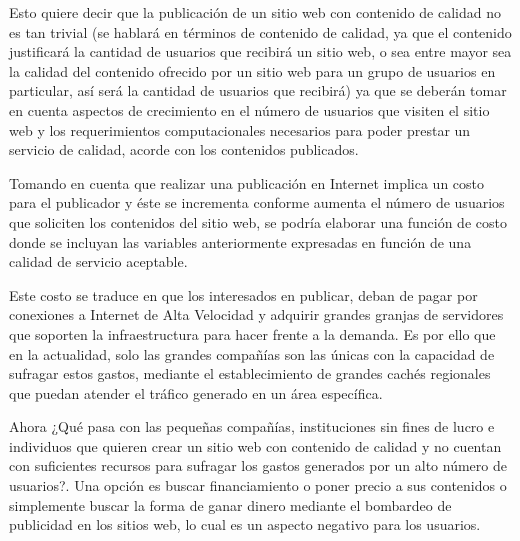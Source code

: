 Esto quiere decir que la publicación de un sitio web con contenido de calidad no es tan trivial (se hablará en términos de contenido de calidad, ya que el contenido justificará la cantidad de usuarios que recibirá un sitio web, o sea entre mayor sea la calidad del contenido ofrecido por un sitio web para un grupo de usuarios en particular, así será la cantidad de usuarios que recibirá) ya que se deberán tomar en cuenta aspectos de crecimiento en el número de usuarios que visiten el sitio web y los requerimientos computacionales necesarios para poder prestar un servicio de calidad, acorde con los contenidos publicados.

Tomando en cuenta que realizar una publicación en Internet implica un costo para el publicador y éste se incrementa conforme aumenta el número de usuarios que soliciten los contenidos del sitio web, se podría elaborar una función de costo donde se incluyan las variables anteriormente expresadas en función de una calidad de servicio aceptable.

Este costo se traduce en que los interesados en publicar, deban de pagar por conexiones a Internet de Alta Velocidad y adquirir grandes granjas de servidores que soporten la infraestructura para hacer frente a la demanda. Es por ello que en la actualidad, solo las grandes compañías son las únicas con la capacidad de sufragar estos gastos, mediante el establecimiento de grandes cachés regionales que puedan atender el tráfico generado en un área específica.

Ahora ¿Qué pasa con las pequeñas compañías, instituciones sin fines de lucro e individuos que quieren crear un sitio web con contenido de calidad y no cuentan con suficientes recursos para sufragar los gastos generados por un alto número de usuarios?. Una opción es buscar financiamiento o poner precio a sus contenidos o simplemente buscar la forma de ganar dinero mediante el bombardeo de publicidad en los sitios web, lo cual es un aspecto negativo para los usuarios.

